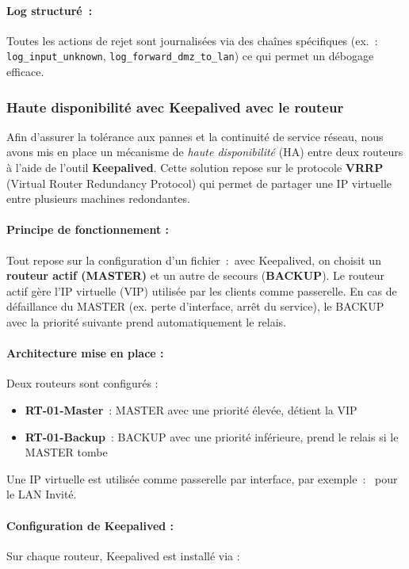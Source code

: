 \documentclass{article}
\begin{document}
\paragraph{Log structuré~:}

Toutes les actions de rejet sont journalisées via des chaînes spécifiques (ex.~: \texttt{log\_input\_unknown}, \texttt{log\_forward\_dmz\_to\_lan}) ce qui permet un débogage efficace.

\subsubsection{Haute disponibilit\'e avec Keepalived avec le routeur}

Afin d’assurer la tolérance aux pannes et la continuité de service réseau, nous avons mis en place un mécanisme de \textit{haute disponibilité} (HA) entre deux routeurs à l’aide de l’outil \textbf{Keepalived}. Cette solution repose sur le protocole \textbf{VRRP} (Virtual Router Redundancy Protocol) qui permet de partager une IP virtuelle entre plusieurs machines redondantes.

\paragraph{Principe de fonctionnement :}
Tout repose sur la configuration d'un fichier~:\ avec Keepalived, on choisit un \textbf{routeur actif (MASTER)} et un autre de secours (\textbf{BACKUP}). Le routeur actif gère l’IP virtuelle (VIP) utilisée par les clients comme passerelle. En cas de défaillance du MASTER (ex. perte d’interface, arrêt du service), le BACKUP avec la priorité suivante prend automatiquement le relais.

\paragraph{Architecture mise en place :}
Deux routeurs sont configurés :
\begin{itemize}
  \item \textbf{RT-01-Master}~: MASTER avec une priorité élevée, détient la VIP
  \item \textbf{RT-01-Backup}~: BACKUP avec une priorité inférieure, prend le relais si le MASTER tombe
\end{itemize}

Une IP virtuelle est utilisée comme passerelle par interface, par exemple~:\  pour le LAN Invité.

\paragraph{Configuration de Keepalived :}
Sur chaque routeur, Keepalived est installé via :
\end{document}
